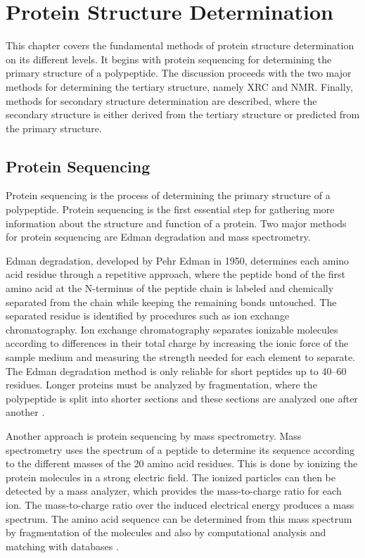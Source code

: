 \chapter{Protein Structure Determination}
\label{ch:PSD}

This chapter covers the fundamental methods of protein structure determination on its different levels. It begins with protein sequencing for determining the primary structure of a polypeptide. The discussion proceeds with the two major methods for determining the tertiary structure, namely \ac{XRC} and \ac{NMR}. Finally, methods for secondary structure determination are described, where the secondary structure is either derived from the tertiary structure or predicted from the primary structure.


\section{Protein Sequencing}
\label{sec:ProtSequencing}

Protein sequencing is the process of determining the primary structure of a polypeptide. Protein sequencing is the first essential step for gathering more information about the structure and function of a protein. 
Two major methods for protein sequencing are Edman degradation and mass spectrometry.

Edman degradation, developed by Pehr Edman in 1950, determines each amino acid residue through a repetitive approach, where the peptide bond of the first amino acid at the N-terminus of the peptide chain is labeled and chemically separated from the chain while keeping the remaining bonds untouched. The separated residue is identified  by procedures such as ion exchange chromatography. Ion exchange chromatography separates ionizable molecules according to differences in their total charge by increasing the ionic force of the sample medium and measuring the strength needed for each element to separate. The Edman degradation method is only reliable for short peptides up to 40--60 residues. Longer proteins must be analyzed by fragmentation, where the polypeptide is split into shorter sections and these sections are analyzed one after another \cite{Berg.imp.2002}.


Another approach is protein sequencing by mass spectrometry. Mass spectrometry uses the spectrum of a peptide to determine its sequence according to the different masses of the 20 amino acid residues. This is done by ionizing the protein molecules in a strong electric field. The ionized particles can then be detected by a mass analyzer, which provides the mass-to-charge ratio for each ion. The mass-to-charge ratio over the induced electrical energy produces a mass spectrum. The amino acid sequence can be determined from this mass spectrum by fragmentation of the molecules and also by computational analysis and matching with databases \cite{Wysocki.2005}.

